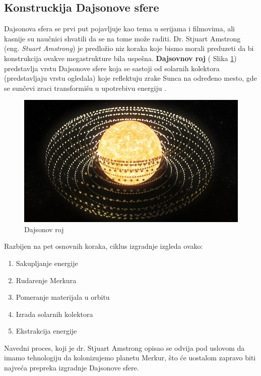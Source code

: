\documentclass[a4paper]{article}
\begin{document}
\subsection{Konstruckija Dajsonove sfere}
Dajsonova sfera se prvi put pojavljuje kao tema u serijama i filmovima, ali kasnije su naučnici shvatili da se na tome može raditi. Dr. Stjuart Amstrong (eng. \emph{Stuart Amstrong}) je predložio niz koraka koje bismo morali preduzeti da bi konstrukcija ovakve megastrukture bila uspešna. \textbf{Dajsovnov roj} ( Slika \ref{slika:dajsonov-roj}) predstavlja vrstu Dajsonove sfere koja se sastoji od solarnih kolektora (predstavljaju vrstu ogledala) koje reflektuju zrake Sunca na određeno mesto, gde se sunčevi zraci transformišu u upotrebivu energiju \cite{dsbuild}.

\begin{figure}[h!]
\begin{center}
\includegraphics[scale=0.3]{Dajsonov-roj.png}
\end{center}
\caption{Dajsonov roj}
\label{slika:dajsonov-roj}
\end{figure}

Razbijen na pet osnovnih koraka, ciklus izgradnje izgleda ovako:

\begin{enumerate}
    \item Sakupljanje energije
    \item Rudarenje Merkura
    \item Pomeranje materijala u orbitu
    \item Izrada solarnih kolektora
    \item Ekstrakcija energije
\end{enumerate}

Navedni proces, koji je dr. Stjuart Amstrong opisao se odvija pod uslovom da imamo tehnologiju da kolonizujemo planetu Merkur, što će uostalom zapravo biti najveća prepreka izgradnje Dajsonove sfere.
\end{document}

